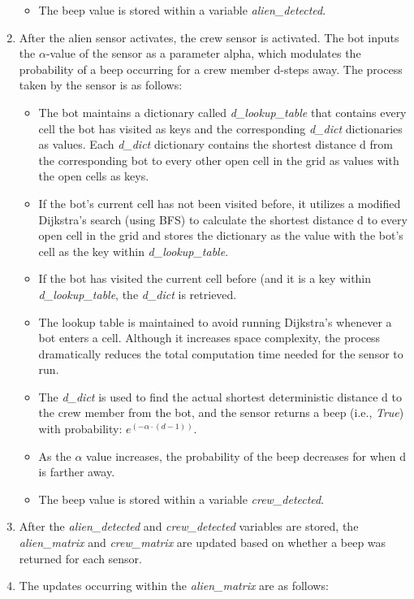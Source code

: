 \documentclass[11pt]{article}
\begin{document}
\begin{enumerate}
\begin{itemize}
        \item The beep value is stored within a variable \emph{alien\_detected}.
    \end{itemize}
    \item After the alien sensor activates, the crew sensor is activated. The bot inputs the $\alpha$-value of the sensor as a parameter alpha, which modulates the probability of a beep occurring for a crew member d-steps away. The process taken by the sensor is as follows:
    \begin{itemize}
        \item The bot maintains a dictionary called \emph{d\_lookup\_table} that contains every cell the bot has visited as keys and the corresponding \emph{d\_dict} dictionaries as values. Each \emph{d\_dict} dictionary contains the shortest distance d from the corresponding bot to every other open cell in the grid as values with the open cells as keys.
        \item If the bot's current cell has not been visited before, it utilizes a modified Dijkstra's search (using BFS) to calculate the shortest distance d to every open cell in the grid and stores the dictionary as the value with the bot's cell as the key within \emph{d\_lookup\_table}.
        \item If the bot has visited the current cell before (and it is a key within \emph{d\_lookup\_table}, the \emph{d\_dict} is retrieved.
        \item The lookup table is maintained to avoid running Dijkstra's whenever a bot enters a cell. Although it increases space complexity, the process dramatically reduces the total computation time needed for the sensor to run.
        \item The \emph{d\_dict} is used to find the actual shortest deterministic distance d to the crew member from the bot, and the sensor returns a beep (i.e., \emph{True}) with probability: $e^{(-\alpha \cdot (d - 1))}$.
        \item As the $\alpha$ value increases, the probability of the beep decreases for when d is farther away.
        \item The beep value is stored within a variable \emph{crew\_detected}.
    \end{itemize}
    \item After the \emph{alien\_detected} and \emph{crew\_detected} variables are stored, the \emph{alien\_matrix} and \emph{crew\_matrix} are updated based on whether a beep was returned for each sensor.
    \item The updates occurring within the \emph{alien\_matrix} are as follows:

\end{enumerate}
\end{document}
